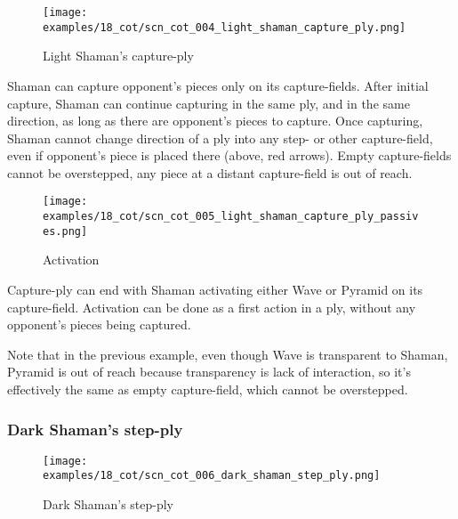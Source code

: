 \vspace*{-1.4\baselineskip}
\noindent
\begin{figure}[!h]
\texttt{[image: examples/18\_cot/scn\_cot\_004\_light\_shaman\_capture\_ply.png]}
\vspace*{-1.4\baselineskip}
\caption{Light Shaman's capture-ply}
\label{fig:scn_cot_004_light_shaman_capture_ply}
\end{figure}

\vspace*{-0.4\baselineskip}
Shaman can capture opponent's pieces only on its capture-fields. After initial capture,
Shaman can continue capturing in the same ply, and in the same direction, as long as
there are opponent's pieces to capture. Once capturing, Shaman cannot change direction
of a ply into any step- or other capture-field, even if opponent's piece is placed
there (above, red arrows). Empty capture-fields cannot be overstepped, any piece at
a distant capture-field is out of reach.

\noindent
\begin{wrapfigure}[6]{l}{0.4\textwidth}
\centering
\texttt{[image: examples/18\_cot/scn\_cot\_005\_light\_shaman\_capture\_ply\_passives.png]}
\vspace*{-1.4\baselineskip}
\caption{Activation}
\label{fig:scn_cot_005_light_shaman_capture_ply_passives}
\end{wrapfigure}
Capture-ply can end with Shaman activating either Wave or Pyramid on its capture-field.
Activation can be done as a first action in a ply, without any opponent's pieces being
captured.

Note that in the previous example, even though Wave is transparent to Shaman, Pyramid
is out of reach because transparency is lack of interaction, so it's effectively the
same as empty capture-field, which cannot be overstepped.

\clearpage %

\subsubsection*{Dark Shaman's step-ply}
\label{sec:Conquest of Tlalocan/Shaman/Movement/Dark Shaman's step-ply}

\vspace*{-1.4\baselineskip}
\noindent
\begin{figure}[!h]
\texttt{[image: examples/18\_cot/scn\_cot\_006\_dark\_shaman\_step\_ply.png]}
\vspace*{-1.4\baselineskip}
\caption{Dark Shaman's step-ply}
\label{fig:scn_cot_006_dark_shaman_step_ply}
\end{figure}

